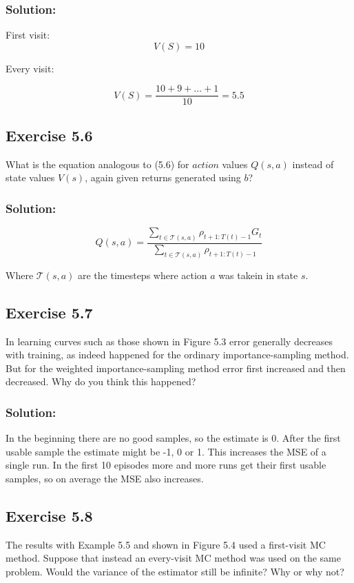 \subsubsection*{Solution:}
First visit:
\[
    V(S) = 10
\]

Every visit:

\[
    V(S) = \frac{10 + 9 + \dots + 1}{10} = 5.5
\]

\subsection*{Exercise 5.6}
What is the equation analogous to (5.6) for $\textit{action}$ values $Q(s, a)$ instead of
state values $V(s)$, again given returns generated using $b$?

\subsubsection*{Solution:}
\[
    Q(s,a) = \frac{\sum_{t \in \mathcal{T}(s,a)} \rho_{t+1:T(t)-1} G_t}{\sum_{t \in \mathcal{T}(s,a)} \rho_{t+1:T(t)-1}}
\]
 
Where $\mathcal{T}(s,a)$ are the timesteps where action $a$ was takein in state $s$.


\subsection*{Exercise 5.7}
In learning curves such as those shown in Figure 5.3 error generally decreases
with training, as indeed happened for the ordinary importance-sampling method. But for
the weighted importance-sampling method error first increased and then decreased. Why
do you think this happened? 

\subsubsection*{Solution:}

In the beginning there are no good samples, so the estimate is 0. After the first usable sample the estimate might be -1, 0 or 1. This increases the MSE of a single run. In the first 10 episodes more and more runs get their first usable samples, so on average the MSE also increases.

\subsection*{Exercise 5.8}
The results with Example 5.5 and shown in Figure 5.4 used a first-visit MC
method. Suppose that instead an every-visit MC method was used on the same problem.
Would the variance of the estimator still be infinite? Why or why not? 


